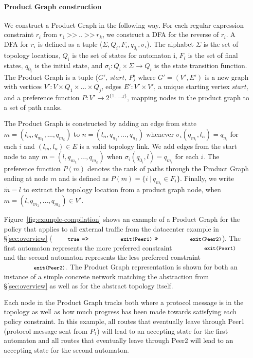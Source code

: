 \documentclass[numbers, 10pt, preprint]{sigplanconf}
\newcommand{\para}[1]{\paragraph*{\textbf{#1}}}
\newcommand{\set}[1]{\ensuremath{\{ #1 \} }}
\newcommand{\CD}[1]{\texttt{\small #1}}  %
\newcommand{\KW}[1]{\texttt{\small\bfseries{#1}}}
\newcommand{\True}{\CD{true}}
\newcommand{\Prefer}{\texttt{>>}}
\newcommand{\Path}{\texttt{=>}}
\newcommand{\Exit}{\KW{exit}}
\begin{document}
\para{Product Graph construction}

We construct a Product Graph in the following way. For each regular expression constraint $r_i$ from $r_1 ~\Prefer~ .. ~\Prefer~ r_k$, we construct a DFA for the reverse of $r_i$. A DFA for $r_i$ is defined as a tuple ($\Sigma, Q_i, F_i, q_{0_i}, \sigma_i$). The alphabet $\Sigma$ is the set of topology locations, $Q_i$ is the set of states for automaton i, $F_i$ is the set of final states, $q_{0_i}$ is the initial state, and $\sigma_i \colon Q_i \times \Sigma \rightarrow Q_i$ is the state transition function.
%
The Product Graph is a tuple ($G'$, $start$, $P$) where $G' = (V',E')$ is a new graph with
vertices $V' \colon V \times Q_1 \times \dots \times Q_j$,
edges $E' \colon V' \times V'$,
a unique starting vertex $start$,
and a preference function $P \colon V' \rightarrow 2^{\set{1, \dots, j}}$, mapping nodes in the product graph to a set of path ranks.

The Product Graph is constructed by adding an edge from state $m = (l_m, q_{m_1}, \dots, q_{m_k})$ to $n = (l_n, q_{n_1}, \dots, q_{n_k})$ whenever $\sigma_i(q_{m_i}, l_n) = q_{n_i}$ for each $i$ and $(l_m,l_n) \in E$ is a valid topology link.
%
We add edges from the start node to any $m = (l, q_{m_1}, \dots, q_{m_k})$ when $\sigma_i(q_{0_i}, l) = q_{m_i}$ for each $i$.
%
The preference function $P(m)$ denotes the rank of paths through the Product Graph ending at node $m$ and is defined as $P(m) = \set{i~\vert~q_{m_i} \in F_i}$.
%
Finally, we write $\tilde{m} = l$ to extract the topology location from a product graph node, when $m = (l, q_{m_1}, \dots, q_{m_k}) \in V'$.

Figure~\ref{fig:example-compilation} shows an example of a Product Graph for the policy that applies to all external traffic from the datacenter example in \S\ref{sec:overview} ($\True ~\Path~ \CD{\Exit(Peer1)} ~\Prefer~ \CD{\Exit(Peer2)}$).
%
%
The first automaton represents the more preferred constraint $\CD{\Exit(Peer1)}$ and the second automaton represents the less preferred constraint $\CD{\Exit(Peer2)}$. The Product Graph representation is shown for both an instance of a simple concrete network matching the abstraction from \S\ref{sec:overview} as well as for the abstract topology itself.

Each node in the Product Graph tracks both where a protocol message is in the topology as well as how much progress has been made towards satisfying each policy constraint. In this example, all routes that eventually leave through Peer1 (protocol message sent from $P_1$) will lead to an accepting state for the first automaton and all routes that eventually leave through Peer2 will lead to an accepting state for the second automaton.
\end{document}
